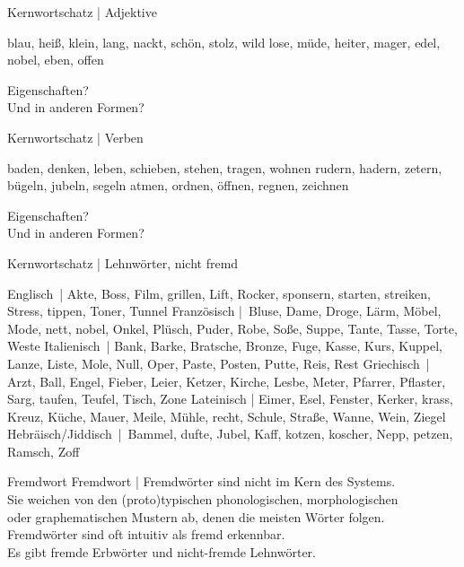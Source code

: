 \begin{frame}
  {Kernwortschatz | Adjektive}
  \onslide<+->
  \onslide<+->
  \begin{exe}
    \ex blau, heiß, klein, lang, nackt, schön, stolz, wild
    \onslide<+->
    \ex lose, müde, heiter, mager, edel, nobel, eben, offen
  \end{exe}
  \onslide<+->
  \Zeile
  Eigenschaften?\\
  \onslide<+->
  \Halbzeile
  Und in anderen Formen?
\end{frame}

\begin{frame}
  {Kernwortschatz | Verben}
  \onslide<+->
  \onslide<+->
  \begin{exe}
  \ex baden, denken, leben, schieben, stehen, tragen, wohnen
  \ex rudern, hadern, zetern, bügeln, jubeln, segeln
  \ex atmen, ordnen, öffnen, regnen, zeichnen
  \end{exe}
  \onslide<+->
  \Zeile
  Eigenschaften?\\
  \onslide<+->
  \Halbzeile
  Und in anderen Formen?
\end{frame}

\begin{frame}
  {Kernwortschatz | Lehnwörter, nicht fremd}
  \onslide<+->
  \onslide<+->
  \begin{exe}
    \ex \alert{Englisch} | Akte, Boss, Film, grillen, Lift, Rocker, sponsern, starten, streiken, Stress, tippen, Toner, Tunnel
    \onslide<+->
    \ex \alert{Französisch} | Bluse, Dame, Droge, Lärm, Möbel, Mode, nett, nobel, Onkel, Plüsch, Puder, Robe, Soße, Suppe, Tante, Tasse, Torte, Weste
    \onslide<+->
    \ex \alert{Italienisch} | Bank, Barke, Bratsche, Bronze, Fuge, Kasse, Kurs, Kuppel, Lanze, Liste, Mole, Null, Oper, Paste, Posten, Putte, Reis, Rest
    \onslide<+->
    \ex \alert{Griechisch} | Arzt, Ball, Engel, Fieber, Leier, Ketzer, Kirche, Lesbe, Meter, Pfarrer, Pflaster, Sarg, taufen, Teufel, Tisch, Zone
    \onslide<+->
    \ex \alert{Lateinisch} | Eimer, Esel, Fenster, Kerker, krass, Kreuz, Küche, Mauer, Meile, Mühle, recht, Schule, Straße, Wanne, Wein, Ziegel
    \onslide<+->
    \ex \alert{Hebräisch\slash Jiddisch} | Bammel, dufte, Jubel, Kaff, kotzen, koscher, Nepp, petzen, Ramsch, Zoff
  \end{exe}
\end{frame}

\begin{frame}
  {Fremdwort}
  \onslide<+->
  \onslide<+->
  \centering 
  \alert{Fremdwort} | Fremdwörter sind \alert{nicht im Kern des Systems}.\\
  Sie weichen von den (proto)typischen phonologischen, morphologischen\\
  oder graphematischen Mustern ab, denen die \alert{meisten Wörter} folgen.\\
  \onslide<+->
  \Zeile
  Fremdwörter sind oft intuitiv als \alert{fremd} erkennbar.\\
  \onslide<+->
  \Zeile
  Es gibt \alert{fremde Erbwörter} und \alert{nicht-fremde Lehnwörter}.
\end{frame}

